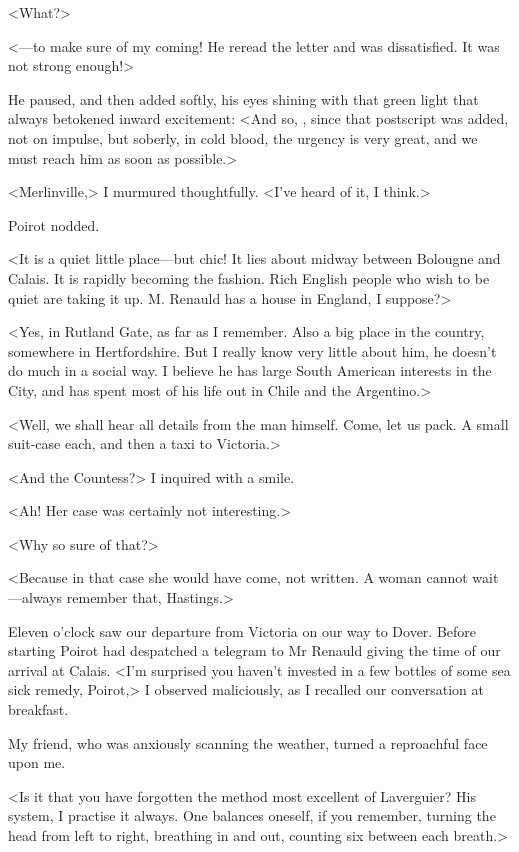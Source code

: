  <What?> 

 <—to make sure of my coming! He reread the letter and was dissatisfied. It was not strong enough!> 

 He paused, and then added softly, his eyes shining with that green light that always betokened inward excitement: <And so, , since that postscript was added, not on impulse, but soberly, in cold blood, the urgency is very great, and we must reach him as soon as possible.> 

 <Merlinville,> I murmured thoughtfully. <I've heard of it, I think.> 

 Poirot nodded. 

 <It is a quiet little place—but chic! It lies about midway between Bolougne and Calais. It is rapidly becoming the fashion. Rich English people who wish to be quiet are taking it up. M. Renauld has a house in England, I suppose?> 

 <Yes, in Rutland Gate, as far as I remember. Also a big place in the country, somewhere in Hertfordshire. But I really know very little about him, he doesn't do much in a social way. I believe he has large South American interests in the City, and has spent most of his life out in Chile and the Argentino.> 

 <Well, we shall hear all details from the man himself. Come, let us pack. A small suit-case each, and then a taxi to Victoria.> 

 <And the Countess?> I inquired with a smile. 

 <Ah!  Her case was certainly not interesting.> 

 <Why so sure of that?> 

 <Because in that case she would have come, not written. A woman cannot wait—always remember that, Hastings.> 

 Eleven o'clock saw our departure from Victoria on our way to Dover. Before starting Poirot had despatched a telegram to Mr Renauld giving the time of our arrival at Calais. <I'm surprised you haven't invested in a few bottles of some sea sick remedy, Poirot,> I observed maliciously, as I recalled our conversation at breakfast. 

 My friend, who was anxiously scanning the weather, turned a reproachful face upon me. 

 <Is it that you have forgotten the method most excellent of Laverguier? His system, I practise it always. One balances oneself, if you remember, turning the head from left to right, breathing in and out, counting six between each breath.> 

